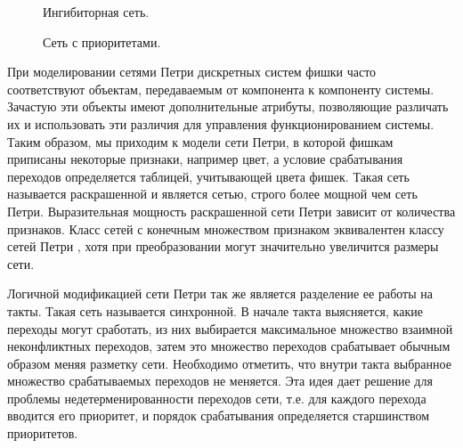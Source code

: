 \begin{figure}
	\begin{minipage}[H]{0.49\linewidth}
		\caption{Ингибиторная сеть.}
		\label{fig:fig3}
	\end{minipage}
	\hfill
	\begin{minipage}[H]{0.49\linewidth}
		\caption{Сеть с приоритетами.}
		\label{fig:fig4}
	\end{minipage}
\end{figure}

При моделировании сетями Петри дискретных систем фишки часто соответствуют объектам, передаваемым от компонента к компоненту системы. Зачастую эти объекты имеют дополнительные атрибуты, позволяющие различать их и использовать эти различия для управления функционированием системы. Таким образом, мы приходим к модели сети Петри, в которой фишкам приписаны некоторые признаки, например цвет, а условие срабатывания переходов определяется таблицей, учитывающей цвета фишек. Такая сеть называется раскрашенной и является сетью, строго более мощной чем сеть Петри. Выразительная мощность раскрашенной сети Петри зависит от количества признаков. Класс сетей с конечным множеством признаком эквивалентен классу сетей Петри \cite{Kotov} \cite{Jensen}, хотя при преобразовании могут значительно увеличится размеры сети. 

Логичной модификацией сети Петри так же является разделение ее работы на такты. Такая сеть называется синхронной. В начале такта выясняется, какие переходы могут сработать, из них выбирается максимальное множество взаимной неконфликтных переходов, затем это множество переходов срабатывает обычным образом меняя разметку сети. Необходимо отметить, что внутри такта выбранное множество срабатываемых переходов не меняется. Эта идея дает решение для проблемы недетерменированности переходов сети, т.е. для каждого перехода вводится его приоритет, и порядок срабатывания определяется старшинством приоритетов. 

